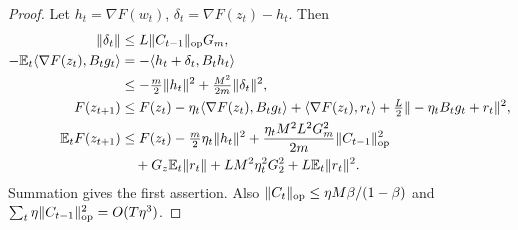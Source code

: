\begin{proof}
Let $h_t=\nabla F(w_t)$, $\delta_t=\nabla F(z_t)-h_t$. Then
\begin{align}
 \|\delta_t\|&\le L\|C_{t-1}\|_{\mathrm{op}}G_m,\\
 -\mathbb E_t\langle\nabla F(z_t),B_tg_t\rangle
 &=-\langle h_t+\delta_t,B_th_t\rangle\\
 &\le-\tfrac m2\|h_t\|^2+\tfrac{M^2}{2m}\|\delta_t\|^2,\\
 F(z_{t+1})&\le F(z_t)-\eta_t\langle\nabla F(z_t),B_tg_t\rangle
 +\langle\nabla F(z_t),r_t\rangle
 +\tfrac L2\|-\eta_tB_tg_t+r_t\|^2,\\
 \mathbb E_tF(z_{t+1})&\le F(z_t)-\tfrac m2\eta_t\|h_t\|^2
 +\frac{\eta_tM^2L^2G_m^2}{2m}\|C_{t-1}\|_{\mathrm{op}}^2
 \notag\\
 &\quad+G_z\mathbb E_t\|r_t\|+LM^2\eta_t^2G_2^2+L\mathbb E_t\|r_t\|^2.
\end{align}
Summation gives the first assertion. Also
$\|C_t\|_{\mathrm{op}}\le\eta M\beta/(1-\beta)$ and
$\sum_t\eta\|C_{t-1}\|_{\mathrm{op}}^2=O(T\eta^3)$.
\end{proof}
